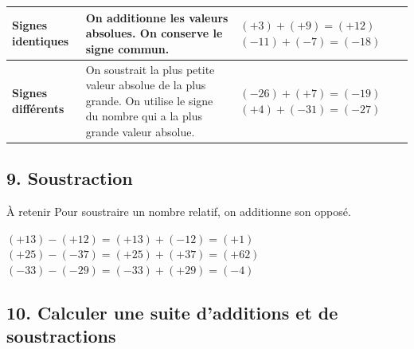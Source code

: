 \def\arraystretch{2}
\begin{tabularx}{\linewidth}{|>{\centering\arraybackslash}p{2cm}|>{\raggedright\arraybackslash}X|>{\raggedright\arraybackslash}p{3.6cm}|}
\hline
\textbf{Signes identiques} & On \textcolor{themeNO}{additionne} les valeurs absolues. \newline On \textcolor{themeNO}{conserve} le signe commun. & $(+3)+(+9)=(+12)$\newline $(-11)+(-7)=(-18)$\\\hline
\textbf{Signes différents} & On \textcolor{themeNO}{soustrait} la plus petite valeur absolue de la plus grande. \newline On \textcolor{themeNO}{utilise} le signe du nombre qui a la plus grande valeur absolue. & $(-26)+(+7)=(-19)$\newline $(+4)+(-31)=(-27)$\\\hline
\end{tabularx}
\def\arraystretch{1}

\newpage
\subsection*{9. Soustraction}

\begin{astuce}{À retenir}
Pour soustraire un nombre relatif, on additionne son \textcolor{themeNO}{opposé}.
\end{astuce}

\begin{center}
$(+13)-(+12)=(+13)+(-12)=(+1)$\\[3pt]
$(+25)-(-37)=(+25)+(+37)=(+62)$\\[3pt]
$(-33)-(-29)=(-33)+(+29)=(-4)$
\end{center}

\vfill
\subsection*{10. Calculer une suite d'additions et de soustractions}

